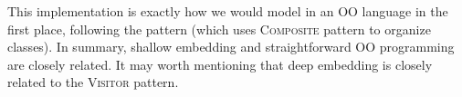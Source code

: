This implementation is exactly how we would model \dsl in an OO language in the first
place, following the \interp pattern (which uses \textsc{Composite} pattern to
organize classes).
In summary, shallow embedding and straightforward OO programming are closely
related.
It may worth mentioning that deep embedding is closely related to the \textsc{Visitor} pattern.
